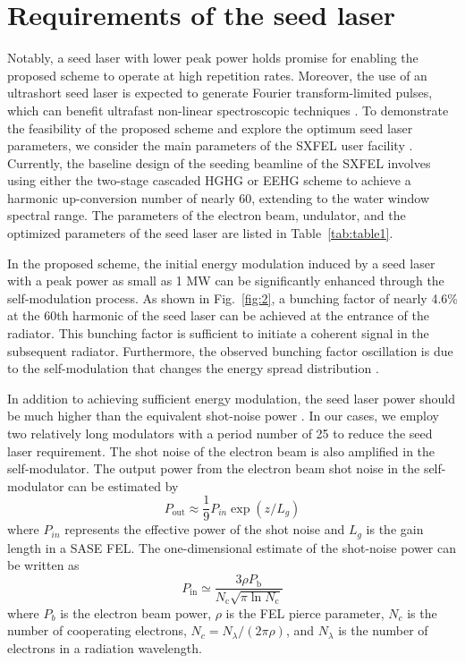 \documentclass[%
 reprint,
 amsmath,amssymb,
 aps,
]{revtex4-2}
\begin{document}
\section{\label{sec:3}Requirements of the seed laser}
Notably, a seed laser with lower peak power holds promise for enabling the proposed scheme to operate at high repetition rates. Moreover, the use of an ultrashort seed laser is expected to generate Fourier transform-limited pulses, which can benefit ultrafast non-linear spectroscopic techniques \citep{Schaper2021}. To demonstrate the feasibility of the proposed scheme and explore the optimum seed laser parameters, we consider the main parameters of the SXFEL user facility \citep{Feng22}. Currently, the baseline design of the seeding beamline of the SXFEL involves using either the two-stage cascaded HGHG or EEHG scheme to achieve a harmonic up-conversion number of nearly 60, extending to the water window spectral range. The parameters of the electron beam, undulator, and the optimized parameters of the seed laser are listed in Table~\ref{tab:table1}.

In the proposed scheme, the initial energy modulation induced by a seed laser with a peak power as small as 1 MW can be significantly enhanced through the self-modulation process. As shown in Fig.~\ref{fig:2}, a bunching factor of nearly 4.6\% at the 60th harmonic of the seed laser can be achieved at the entrance of the radiator. This bunching factor is sufficient to initiate a coherent signal in the subsequent radiator. Furthermore, the observed bunching factor oscillation is due to the self-modulation that changes the energy spread distribution \citep{Ferrari2014,Wang2015}. 

In addition to achieving sufficient energy modulation, the seed laser power should be much higher than the equivalent shot-noise power \citep{Marinelli2008}. In our cases, we employ two relatively long modulators with a period number of 25 to reduce the seed laser requirement. The shot noise of the electron beam is also amplified in the self-modulator. The output power from the electron beam shot noise in the self-modulator can be estimated by \cite{Huang2007}
\begin{equation}
    P_{\mathrm{out}}\approx\frac{1}{9}P_{in}\exp{\left(z/L_g\right)}\label{eq:3}
\end{equation}
where $P_{in}$ represents the effective power of the shot noise and $L_g$ is the gain length in a SASE FEL. The one-dimensional estimate of the shot-noise power can be written as \citep{saldin1999physics}
\begin{equation}
    P_{\mathrm{in}}\simeq\frac{3\rho P_\mathrm{b}}{N_\mathrm{c}\sqrt{\pi\ln{N_\mathrm{c}}}}\label{eq:4}
\end{equation}
where $P_{b}$ is the electron beam power, $\rho$ is the FEL pierce parameter, $N_{c}$ is the number of cooperating electrons, $N_c=N_\lambda/\left(2\pi\rho\right)$, and $N_{\lambda}$ is the number of electrons in a radiation wavelength.
\end{document}
